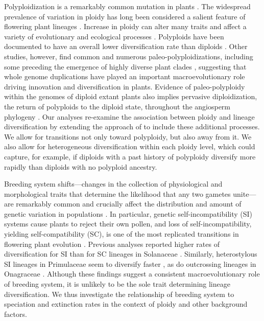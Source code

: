 Polyploidization is a remarkably common mutation in plants \citep{husband_2013, zenilferguson_2017}.
The widespread prevalence of variation in ploidy has long been considered a salient feature of flowering plant lineages \citep{stebbins1938}. 
Increase in ploidy can alter many traits and affect a variety of evolutionary and ecological processes \citep{ramsey_2002, sessa_2019}.
%
Polyploids have been documented to have an overall lower diversification rate than diploids \citep{mayrose_2011, mayrose_2015}. 
Other studies, however, find common and numerous paleo-polyploidizations, including some preceding the emergence of highly diverse plant clades \citep{soltis_2014, landis_2018}, suggesting that whole genome duplications have played an important macroevolutionary role driving innovation and diversification in plants. 
Evidence of paleo-polyploidy within the genomes of diploid extant plants also implies pervasive diploidization, the return of polyploids to the diploid state, throughout the angiosperm phylogeny \citep{soltis_2015, dodsworth_2015}.
Our analyses re-examine the association between ploidy and lineage diversification by extending the approach of \citet{mayrose_2011, mayrose_2015} to include these additional processes.
We allow for transitions not only toward polyploidy, but also away from it.
We also allow for heterogeneous diversification within each ploidy level, which could capture, for example, if diploids with a past history of polyploidy diversify more rapidly than diploids with no polyploid ancestry.

Breeding system shifts---changes in the collection of physiological and morphological traits that determine the likelihood that any two gametes unite---are remarkably common and crucially affect the distribution and amount of genetic variation in populations \citep{stebbins1974, barrett2013}.
In particular, genetic self-incompatibility (SI) systems cause plants to reject their own pollen, and loss of self-incompatibility, yielding self-compatibility (SC), is one of the most replicated transitions in flowering plant evolution \citep{stebbins1974, igic_2008}.
Previous analyses reported higher rates of diversification for SI than for SC lineages in Solanaceae \citep{goldberg_2010}. 
Similarly, heterostylous SI lineages in Primulaceae seem to diversify faster \citep{devos2014}, as do outcrossing lineages in Onagraceae \citep{freyman_2019}.
Although these findings suggest a consistent macroevolutionary role of breeding system, it is unlikely to be the sole trait determining lineage diversification.
We thus investigate the relationship of breeding system to speciation and extinction rates in the context of ploidy and other background factors.

